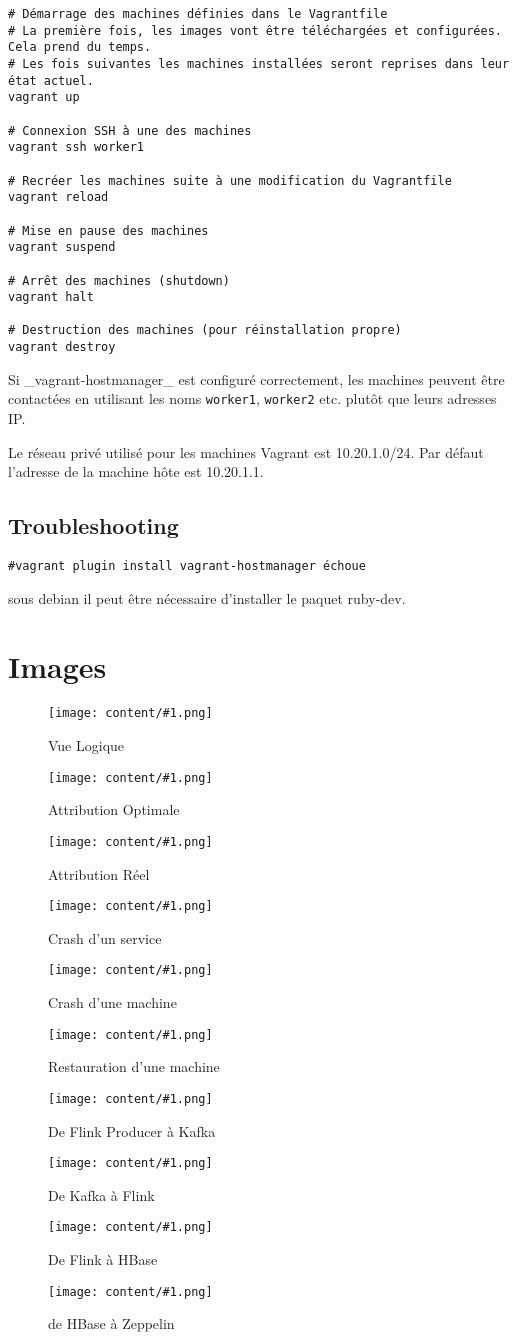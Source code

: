 \documentclass[a4paper,oneside,12pt]{article}
\newcommand\appendixpicture[3]{
	\begin{figure}[h]
	\centering
	\texttt{[image: content/\#1.png]}
	\caption{#2}
	\label{#1}
	\end{figure}
}
\begin{document}
\begin{verbatim}
# Démarrage des machines définies dans le Vagrantfile
# La première fois, les images vont être téléchargées et configurées. Cela prend du temps.
# Les fois suivantes les machines installées seront reprises dans leur état actuel.
vagrant up

# Connexion SSH à une des machines
vagrant ssh worker1

# Recréer les machines suite à une modification du Vagrantfile
vagrant reload

# Mise en pause des machines
vagrant suspend

# Arrêt des machines (shutdown)
vagrant halt

# Destruction des machines (pour réinstallation propre)
vagrant destroy
\end{verbatim}

Si \_vagrant-hostmanager\_ est configuré correctement, les machines peuvent être contactées en utilisant les noms \verb!worker1!, \verb!worker2! etc. plutôt que leurs adresses IP.

Le réseau privé utilisé pour les machines Vagrant est 10.20.1.0/24. Par défaut l'adresse de la machine hôte est 10.20.1.1.

\subsection{Troubleshooting}

\verb!#vagrant plugin install vagrant-hostmanager échoue!

sous debian il peut être nécessaire d'installer le paquet ruby-dev.

\appendix

\section{Images}

\appendixpicture{vuelogique}{Vue Logique}{15}
\appendixpicture{archioptimal}{Attribution Optimale}{15}
\appendixpicture{archireel}{Attribution Réel}{15}
\appendixpicture{archicrashservice}{Crash d'un service}{15}
\appendixpicture{archicrashmachine}{Crash d'une machine}{15}
\appendixpicture{archicomeback}{Restauration d'une machine}{15}

\appendixpicture{flinkkafka}{De Flink Producer à Kafka}{15}
\appendixpicture{kafkaflink}{De Kafka à Flink}{15}
\appendixpicture{flinkhbase}{De Flink à HBase}{15}
\appendixpicture{hbasezeppelin}{de HBase à Zeppelin}{15}
\end{document}
